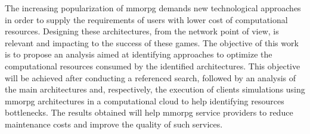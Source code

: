 The increasing popularization of \acf{mmorpg} demands new technological approaches in order to supply the requirements of users with lower cost of computational resources.
%
Designing these architectures, from the network point of view, is relevant and impacting to the success of these games.
%
The objective of this work is to propose an analysis aimed at identifying approaches to optimize the computational resources consumed by the identified architectures.
%
This objective will be achieved after conducting a referenced search, followed by an analysis of the main architectures and, respectively, the execution of clients simulations using \ac{mmorpg} architectures in a computational cloud to help identifying resources bottlenecks.
%
The results obtained will help \ac{mmorpg} service providers to reduce maintenance costs and improve the quality of such services.
